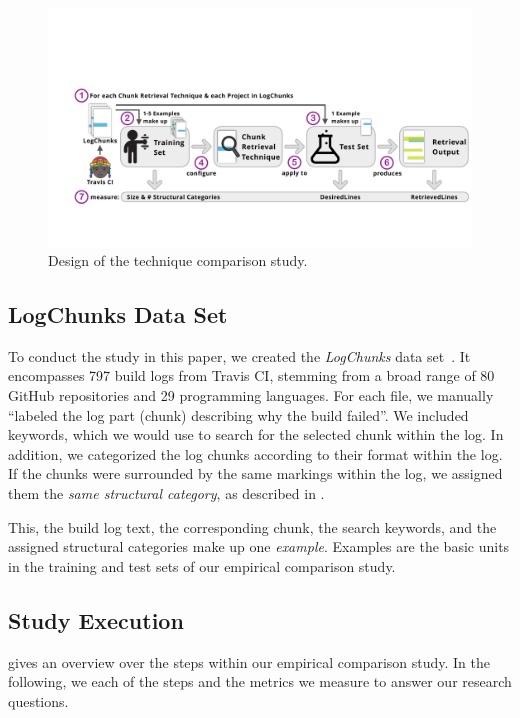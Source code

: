 \begin{figure}[tb]
	\centering
	\includegraphics[width=\textwidth, trim={1.6cm 2.5cm 0.2cm 4.8cm},
  clip]{img/study.pdf}
	\caption{Design of the technique comparison study.}
	\label{fig:study}
\end{figure}


\subsection{LogChunks Data Set}
\label{sec:logchunks}
To conduct the study in this paper, we created the
\emph{LogChunks} data set~\cite{brandt2020logchunks}.
It encompasses 797 build logs from Travis CI,
stemming from a broad range of 80 GitHub repositories and 29
programming languages.
For each file, we manually ``labeled
the log part (chunk) describing why the build
failed''.
We included keywords, which we
would use to search for the selected chunk within the log.
In
addition, we categorized the log chunks according to their format
within the log.
If the chunks were surrounded by the same markings
within the log, we assigned them the \emph{same structural category},
as described in .

This, the build log text, the corresponding chunk,
the search keywords, and the assigned structural categories
make up one \emph{example}.
Examples are the basic units in the training and test sets of our
empirical comparison study.

\subsection{Study Execution}
 gives an overview over the steps within our empirical
comparison study.
In the following, we each of the steps and the metrics
we measure to answer our research questions.

